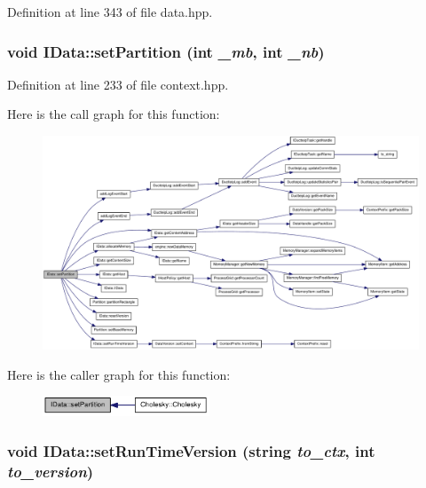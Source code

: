 Definition at line 343 of file data.hpp.\hypertarget{class_i_data_a9924a4023a9fedf223a74abfd96c72a0}{
\subsubsection[{setPartition}]{\setlength{\rightskip}{0pt plus 5cm}void IData::setPartition (int {\em \_\-mb}, \/  int {\em \_\-nb})}}
\label{class_i_data_a9924a4023a9fedf223a74abfd96c72a0}


Definition at line 233 of file context.hpp.

Here is the call graph for this function:\nopagebreak
\begin{figure}[H]
\begin{center}
\leavevmode
\includegraphics[width=420pt]{class_i_data_a9924a4023a9fedf223a74abfd96c72a0_cgraph}
\end{center}
\end{figure}


Here is the caller graph for this function:\nopagebreak
\begin{figure}[H]
\begin{center}
\leavevmode
\includegraphics[width=141pt]{class_i_data_a9924a4023a9fedf223a74abfd96c72a0_icgraph}
\end{center}
\end{figure}
\hypertarget{class_i_data_af915b3633d8d539f6aa16aa0657cfc18}{
\subsubsection[{setRunTimeVersion}]{\setlength{\rightskip}{0pt plus 5cm}void IData::setRunTimeVersion (string {\em to\_\-ctx}, \/  int {\em to\_\-version})}}
\label{class_i_data_af915b3633d8d539f6aa16aa0657cfc18}


